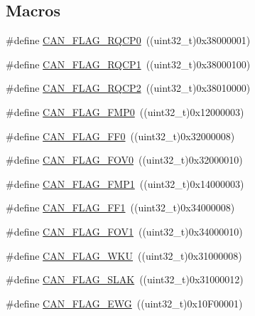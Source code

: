 \subsection*{Macros}
\begin{DoxyCompactItemize}
\item 
\#define \hyperlink{group___c_a_n__flags_ga6df0579049eb471720ea103c5446298b}{C\+A\+N\+\_\+\+F\+L\+A\+G\+\_\+\+R\+Q\+C\+P0}~((uint32\+\_\+t)0x38000001)
\item 
\#define \hyperlink{group___c_a_n__flags_gaba705586ebc3d961507436c03a2feaba}{C\+A\+N\+\_\+\+F\+L\+A\+G\+\_\+\+R\+Q\+C\+P1}~((uint32\+\_\+t)0x38000100)
\item 
\#define \hyperlink{group___c_a_n__flags_ga9c20cd47e558135bd7ae71149583d487}{C\+A\+N\+\_\+\+F\+L\+A\+G\+\_\+\+R\+Q\+C\+P2}~((uint32\+\_\+t)0x38010000)
\item 
\#define \hyperlink{group___c_a_n__flags_ga4b40574700edfe752433bb4e0d457c64}{C\+A\+N\+\_\+\+F\+L\+A\+G\+\_\+\+F\+M\+P0}~((uint32\+\_\+t)0x12000003)
\item 
\#define \hyperlink{group___c_a_n__flags_ga11648741ff43af1561ce7009698fb797}{C\+A\+N\+\_\+\+F\+L\+A\+G\+\_\+\+F\+F0}~((uint32\+\_\+t)0x32000008)
\item 
\#define \hyperlink{group___c_a_n__flags_ga2abd66b5e0032132673208decd2d01f2}{C\+A\+N\+\_\+\+F\+L\+A\+G\+\_\+\+F\+O\+V0}~((uint32\+\_\+t)0x32000010)
\item 
\#define \hyperlink{group___c_a_n__flags_ga5d4b7376954a059fbd74ed8d688f6657}{C\+A\+N\+\_\+\+F\+L\+A\+G\+\_\+\+F\+M\+P1}~((uint32\+\_\+t)0x14000003)
\item 
\#define \hyperlink{group___c_a_n__flags_ga0fa967743c5db04189bb2160aa48e371}{C\+A\+N\+\_\+\+F\+L\+A\+G\+\_\+\+F\+F1}~((uint32\+\_\+t)0x34000008)
\item 
\#define \hyperlink{group___c_a_n__flags_gac1af6e61b1285ddc4658c4bcc152719a}{C\+A\+N\+\_\+\+F\+L\+A\+G\+\_\+\+F\+O\+V1}~((uint32\+\_\+t)0x34000010)
\item 
\#define \hyperlink{group___c_a_n__flags_ga18c72dbe75cb80e8b5126c23c9120818}{C\+A\+N\+\_\+\+F\+L\+A\+G\+\_\+\+W\+KU}~((uint32\+\_\+t)0x31000008)
\item 
\#define \hyperlink{group___c_a_n__flags_gad087b5025a3d5ead2c32b06663821cf4}{C\+A\+N\+\_\+\+F\+L\+A\+G\+\_\+\+S\+L\+AK}~((uint32\+\_\+t)0x31000012)
\item 
\#define \hyperlink{group___c_a_n__flags_gae8906ba9c4031866c5096418ffa9bf71}{C\+A\+N\+\_\+\+F\+L\+A\+G\+\_\+\+E\+WG}~((uint32\+\_\+t)0x10\+F00001)
\item 

\end{DoxyCompactItemize}
